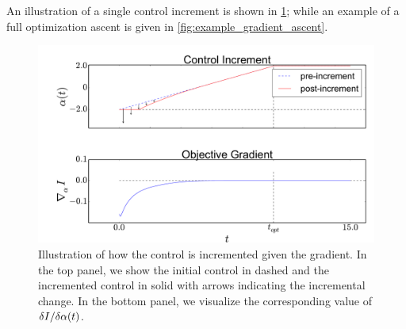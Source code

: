 \documentclass{article}
\begin{document}
An illustration of a single control increment is shown in
\cref{fig:example_control_increment}; while an example of a full optimization ascent is given in \cref{fig:example_gradient_ascent}.

\begin{figure}[htp]
\begin{center}
  \includegraphics[width=\textwidth]{Figs/FP_Adjoint/control_increment_example.pdf}
  \caption[Single control Increment Illustration]{Illustration of how the
  control is incremented given the gradient. In the top panel, we show the
  initial control in dashed and the incremented control in solid with arrows
  indicating the incremental change. In the bottom panel, we visualize the
  corresponding value of $\delta I/ \delta {\alpha} (t)$. }
  \label{fig:example_control_increment}    
\end{center}
\end{figure}
           
\end{document}
